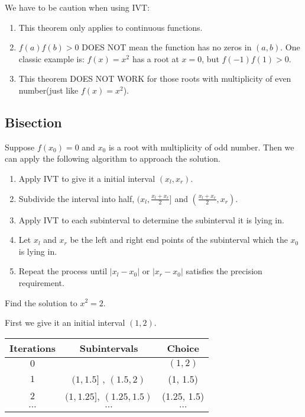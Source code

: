 \begin{summary}
	We have to be caution when using IVT:
	\begin{enumerate}
		\item This theorem only applies to continuous functions.
		\item $f(a)f(b) > 0$ DOES NOT mean the function has no zeros in $(a,b)$.
		One classic example is: $f(x) = x^2$ has a root at $x=0$, but $f(-1)f(1) >0$.
		\item This theorem DOES NOT WORK for those roots with multiplicity of even number(just like $f(x) = x^2$). 
	\end{enumerate}
\end{summary}

\subsection*{Bisection}
\begin{thm}
	Suppose $f(x_0) = 0$ and $x_0$ is a root with multiplicity of odd number. Then
	we can apply the following algorithm to approach the solution.
	\begin{enumerate}
		\item Apply IVT to give it a initial interval $(x_l,x_r)$.
		\item Subdivide the interval into half, $(x_l, \frac{x_l+x_r}{2}]$ and $(\frac{x_l + x_r}{2},x_r)$.
		\item Apply IVT to each subinterval to determine the subinterval it is lying in.
		\item Let $x_l$ and $x_r$ be the left and right end points of the subinterval which the $x_0$ is lying in.
		\item Repeat the process until $|x_l - x_0|$ or $|x_r - x_0|$ satisfies the precision requirement. 
	\end{enumerate}
\end{thm}

\begin{ex}
	Find the solution to $x^2 = 2$.
\end{ex}
\begin{solution}
	First we give it an initial interval $(1,2)$.
	
	\begin{tabular}{|c|c|c|}
		\hline 
		Iterations & Subintervals & Choice \\ 
		\hline 
		$0$ &  & $(1,2)$ \\ 
		\hline 
		$1$ & $(1,1.5]$ , $(1.5,2)$  & (1, 1.5)\\
		\hline
		$2$ & $(1,1.25]$, $(1.25,1.5)$ & (1.25, 1.5)\\
		\hline
		$\cdots$ & $\cdots$ & $\cdots$\\
		\hline
	\end{tabular}  
\end{solution}


